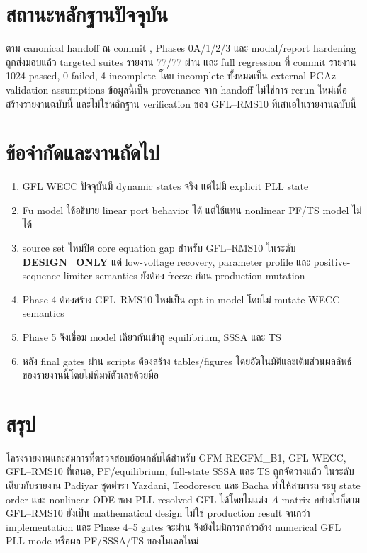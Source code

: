 \documentclass[12pt,a4paper]{article}
\newcommand{\code}[1]{\texttt{\detokenize{#1}}}
\newcommand{\designonly}{\textcolor{purple!75!black}{\textbf{DESIGN\_ONLY}}}
\begin{document}
\section{สถานะหลักฐานปัจจุบัน}

ตาม canonical handoff ณ commit \code{7c72b94}, Phases 0A/1/2/3 และ modal/report
hardening ถูกส่งมอบแล้ว targeted suites รายงาน 77/77 ผ่าน และ full regression ที่
commit \code{80568cf} รายงาน 1024 passed, 0 failed, 4 incomplete โดย incomplete
ทั้งหมดเป็น external PGAz validation assumptions ข้อมูลนี้เป็น provenance จาก handoff
ไม่ใช่การ rerun ใหม่เพื่อสร้างรายงานฉบับนี้ และไม่ใช่หลักฐาน verification ของ
GFL--RMS10 ที่เสนอในรายงานฉบับนี้

\section{ข้อจำกัดและงานถัดไป}

\begin{enumerate}
\item GFL WECC ปัจจุบันมี dynamic states จริง แต่ไม่มี explicit PLL state
\item Fu model ใช้อธิบาย linear port behavior ได้ แต่ใช้แทน nonlinear PF/TS model ไม่ได้
\item source set ใหม่ปิด core equation gap สำหรับ GFL--RMS10 ในระดับ \designonly{}
แต่ low-voltage recovery, parameter profile และ positive-sequence limiter semantics
ยังต้อง freeze ก่อน production mutation
\item Phase 4 ต้องสร้าง GFL--RMS10 ใหม่เป็น opt-in model โดยไม่ mutate WECC semantics
\item Phase 5 จึงเชื่อม model เดียวกันเข้าสู่ equilibrium, SSSA และ TS
\item หลัง final gates ผ่าน scripts ต้องสร้าง tables/figures โดยอัตโนมัติและเติมส่วนผลลัพธ์
ของรายงานนี้โดยไม่พิมพ์ตัวเลขด้วยมือ
\end{enumerate}

\section{สรุป}

โครงรายงานและสมการที่ตรวจสอบย้อนกลับได้สำหรับ GFM REGFM\_B1, GFL WECC,
GFL--RMS10 ที่เสนอ, PF/equilibrium, full-state SSSA และ TS ถูกจัดวางแล้ว
ในระดับเดียวกับรายงาน Padiyar ชุดตำรา Yazdani, Teodorescu และ Bacha ทำให้สามารถ
ระบุ state order และ nonlinear ODE ของ PLL-resolved GFL ได้โดยไม่แต่ง $A$ matrix
อย่างไรก็ตาม GFL--RMS10 ยังเป็น mathematical design ไม่ใช่ production result
จนกว่า implementation และ Phase 4--5 gates จะผ่าน จึงยังไม่มีการกล่าวอ้าง numerical
GFL PLL mode หรือผล PF/SSSA/TS ของโมเดลใหม่
\end{document}
